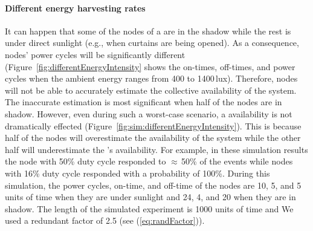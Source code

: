\paragraph{Different energy harvesting rates}
It can happen that some of the nodes of a \cis are in the shadow while the rest is under direct sunlight (e.g., when curtains are being opened). 
As a consequence, nodes' power cycles will be significantly different (Figure~\ref{fig:differentEnergyIntensity} shows the on-times, off-times, and power cycles when the ambient energy ranges from 400 to 1400\,lux). Therefore, nodes will not be able to accurately estimate the collective availability of the system. 
%
The inaccurate estimation is most significant when half of the nodes are in shadow. 
However, even during such a worst-case scenario, a \cis availability is not dramatically effected (Figure~\ref{fig:sim:differentEnergyIntensity}). 
This is because half of the nodes will overestimate the availability of the system while the other half will underestimate the \cis's availability.
For example, in these simulation results the node with 50\% duty cycle responded to $\approx$\,50\% of the events while nodes with 16\% duty cycle responded with a probability of 100\%. 
During this simulation, the power cycles, on-time, and off-time of the nodes are 10, 5, and 5 units of time when they are under sunlight and 24, 4, and 20 when they are in shadow. 
The length of the simulated experiment is 1000 units of time and We used a redundant factor of 2.5 (see (\ref{eq:randFactor})).









































